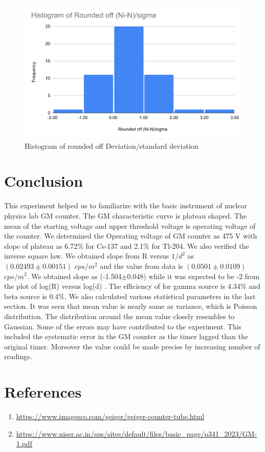 \documentclass[a4paper, amsfonts, amssymb, amsmath, reprint, showkeys, nofootinbib, twoside]{revtex4-1}
\begin{document}
\begin{figure}[H]
	\centering
	\includegraphics[scale=0.4]{round} 
	\caption{Histogram of rounded off Deviation/standard deviation}
	\label{r}
\end{figure}

\section{Conclusion}
This experiment helped us to familiarize with the basic instrument of nuclear physics lab GM counter. The GM characteristic curve is plateau shaped. The mean of the starting voltage and upper threshold voltage is operating voltage of the counter. We determined the Operating voltage of GM counter as 475 V with slope of plateau as 6.72\% for Cs-137 and 2.1\% for Tl-204. We also verified the inverse square law. We obtained slope from R versus $1/d^2$ as $(0.02493\pm0.00151) $ $cps/m^2$ and the value from data is $(0.0501\pm0.0109)$ $cps/m^2$. We obtained slope as (-1.504$\pm$0.048) while it was expected to be -2 from the plot of log(R) versus log(d) . The efficiency of for gamma source is 4.34\% and beta source is 0.4\%. We also calculated various statistical parameters in the last section. It was seen that mean value is nearly same as variance, which is Poisson distribution. The distribution around the mean value closely resembles to Gaussian. Some of the errors may have contributed to the experiment. This included the systematic error in the GM counter as the timer lagged than the original timer. Moreover the value could be made precise by increasing number of readings.

\section{References}
\begin{enumerate}
\item{\url{https://www.imagesco.com/geiger/geiger-counter-tube.html}}
\item{\url{https://www.niser.ac.in/sps/sites/default/files/basic_page/p341_2023/GM-1.pdf}}

\end{enumerate}
\end{document}
